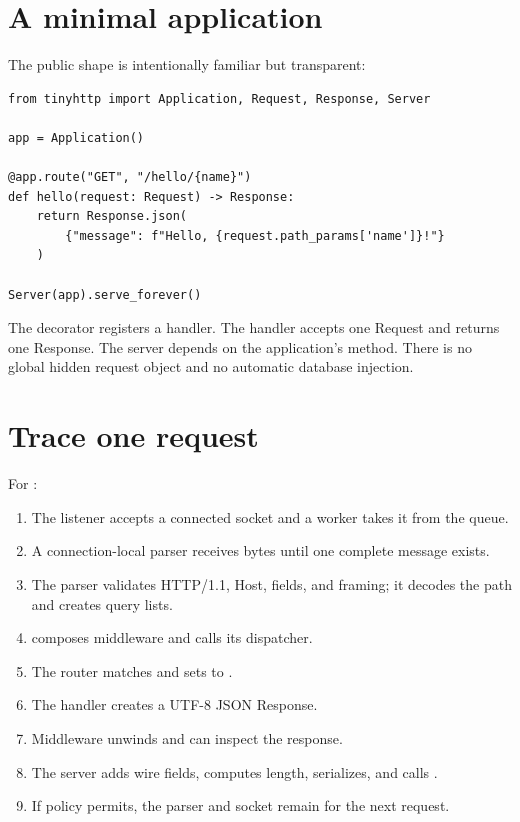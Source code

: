 \section{A minimal application}

The public shape is intentionally familiar but transparent:

\begin{lstlisting}[style=pythonbook]
from tinyhttp import Application, Request, Response, Server

app = Application()

@app.route("GET", "/hello/{name}")
def hello(request: Request) -> Response:
    return Response.json(
        {"message": f"Hello, {request.path_params['name']}!"}
    )

Server(app).serve_forever()
\end{lstlisting}

The decorator registers a handler. The handler accepts one Request and returns
one Response. The server depends on the application's  method.
There is no global hidden request object and no automatic database injection.

\section{Trace one request}

For  :

\begin{enumerate}
  \item The listener accepts a connected socket and a worker takes it from the queue.
  \item A connection-local parser receives bytes until one complete message exists.
  \item The parser validates HTTP/1.1, Host, fields, and framing; it decodes the
        path and creates query lists.
  \item {} composes middleware and calls its dispatcher.
  \item The router matches  and sets
         to .
  \item The handler creates a UTF-8 JSON Response.
  \item Middleware unwinds and can inspect the response.
  \item The server adds wire fields, computes length, serializes, and calls
        .
  \item If policy permits, the parser and socket remain for the next request.
\end{enumerate}

